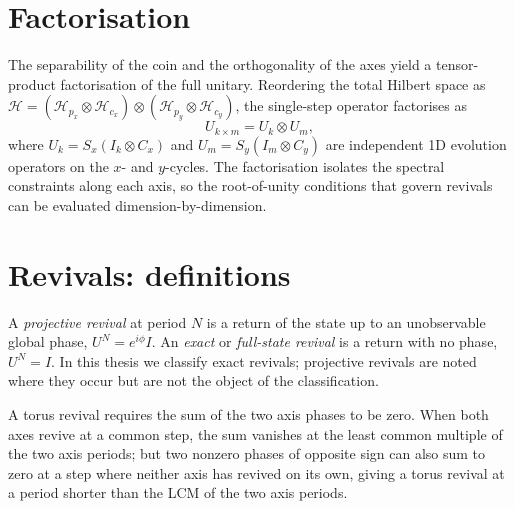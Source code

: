 \section{Factorisation}
The separability of the coin and the orthogonality of the axes yield a
tensor-product factorisation of the full unitary. Reordering the total
Hilbert space as
$\mathcal{H} = (\mathcal{H}_{p_x} \otimes \mathcal{H}_{c_x}) \otimes
(\mathcal{H}_{p_y} \otimes \mathcal{H}_{c_y})$, the single-step operator
factorises as
\begin{equation}
  U_{k\times m} = U_k \otimes U_m,
  \label{eq:factorised-unitary}
\end{equation}
where $U_k = S_x(I_k \otimes C_x)$ and $U_m = S_y(I_m \otimes C_y)$ are
independent 1D evolution operators on the $x$- and $y$-cycles. The
factorisation isolates the spectral constraints along each axis, so the
root-of-unity conditions that govern revivals can be evaluated
dimension-by-dimension.

\section{Revivals: definitions}
A \emph{projective revival} at period $N$ is a return of the state up to
an unobservable global phase, $U^N = e^{i\phi} I$. An \emph{exact} or
\emph{full-state revival} is a return with no phase, $U^N = I$. In this
thesis we classify exact revivals; projective revivals are noted where
they occur but are not the object of the classification.

A torus revival requires the sum of the two axis phases to be zero. When
both axes revive at a common step, the sum vanishes at the least common
multiple of the two axis periods; but two nonzero phases of opposite sign
can also sum to zero at a step where neither axis has revived on its own,
giving a torus revival at a period shorter than the LCM of the two axis
periods.


